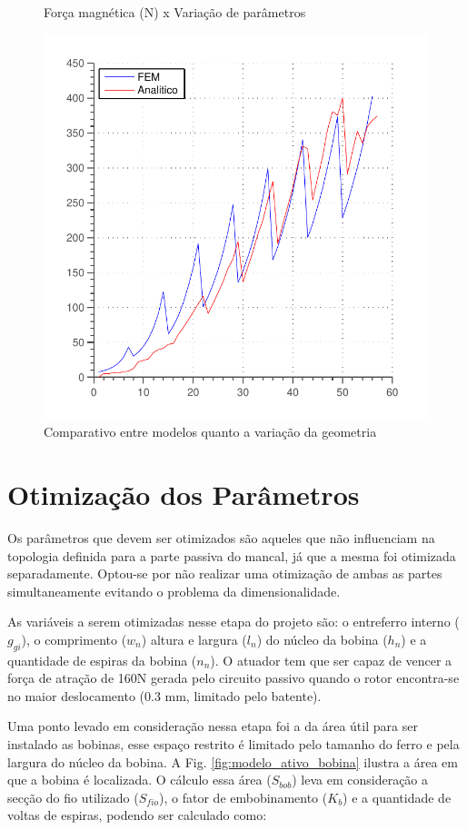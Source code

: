 \begin{figure}[th]
	\centering
	\caption{Força magnética (N) x Variação de parâmetros}
	\includegraphics[width=0.7\linewidth]{Figs/Simulacoes/Ativo/validacao_ativo_2d}
	\caption{Comparativo entre modelos quanto a variação da geometria}
	\label{fig:validacao_ativo_2d}
\end{figure}

\section{Otimização dos Parâmetros}

Os parâmetros que devem ser otimizados são aqueles que não influenciam na topologia definida para a parte passiva do mancal, já que a mesma foi otimizada separadamente. Optou-se por não realizar uma otimização de ambas as partes simultaneamente evitando o problema da dimensionalidade.

As variáveis a serem otimizadas nesse etapa do projeto são: o entreferro interno ($g_{gi}$), o comprimento ($w_n$) altura  e largura ($l_n$) do núcleo da bobina ($h_n$) e a quantidade de espiras da bobina ($n_n$). O atuador tem que ser capaz de vencer a força de atração de 160N gerada pelo circuito passivo quando o rotor encontra-se no maior deslocamento (0.3 mm, limitado pelo batente). 

Uma ponto levado em consideração nessa etapa foi a da área útil para ser instalado as bobinas, esse espaço restrito é limitado pelo tamanho do ferro e pela largura do núcleo da bobina. A Fig. \ref{fig:modelo_ativo_bobina} ilustra a área em que a bobina é localizada. O cálculo essa área ($S_{bob}$) leva em consideração a secção do fio utilizado ($S_{fio}$), o fator de embobinamento ($K_b$) e a quantidade de voltas de espiras, podendo ser calculado como:

